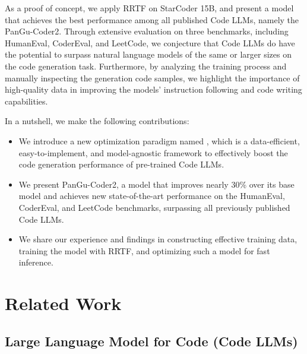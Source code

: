 \documentclass{article}
\newcommand{\pgcoder}{PanGu-Coder2\xspace}
\begin{document}
As a proof of concept, we apply RRTF on StarCoder 15B, and present a model that achieves the best performance among all published Code LLMs, namely the \pgcoder.
Through extensive evaluation on three benchmarks, including HumanEval, CoderEval, and LeetCode, we conjecture that Code LLMs do have the potential to surpass natural language models of the same or larger sizes on the code generation task. Furthermore, by analyzing the training process and manually inspecting the generation code samples, we highlight the importance of high-quality data in improving the models' instruction following and code writing capabilities.

In a nutshell, we make the following contributions:

\begin{itemize}
    \item We introduce a new optimization paradigm named \rrtf, which is a data-efficient, easy-to-implement, and model-agnostic framework to effectively boost the code generation performance of pre-trained Code LLMs.
    \item We present \pgcoder, a model that improves nearly 30\% over its base model and achieves new state-of-the-art performance on the HumanEval, CoderEval, and LeetCode benchmarks, surpassing all previously published Code LLMs.
    \item We share our experience and findings in constructing effective training data, training the model with RRTF, and optimizing such a model for fast inference.
\end{itemize}



\section{Related Work}
\label{sec.related}

\subsection{Large Language Model for Code (Code LLMs)}
\end{document}
